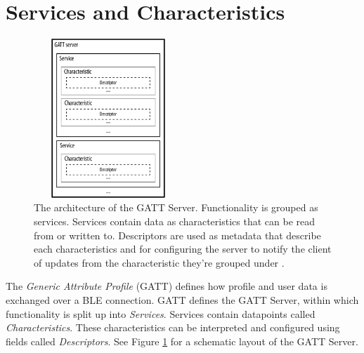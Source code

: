 \section{Services and Characteristics}
\begin{figure}[]
    \centering
    \includegraphics[width=0.5\textwidth,height=6cm,keepaspectratio=true]{images/gatt_service}
    \caption{
        The architecture of the GATT Server. Functionality is grouped as services. Services contain data as characteristics that can be read from or written to. Descriptors are used as metadata that describe each characteristics and for configuring the server to notify the client of updates from the characteristic they're grouped under \cite{townsend_cufi}.
    }
    \label{fig:gatt_server}
\end{figure}
The \textit{Generic Attribute Profile} (GATT) defines how profile and user data is exchanged over a BLE connection. GATT defines the GATT Server, within which functionality is split up into \textit{Services}. Services contain datapoints called \textit{Characteristics}. These characteristics can be interpreted and configured using fields called \textit{Descriptors}. See Figure \ref{fig:gatt_server} for a schematic layout of the GATT Server.


